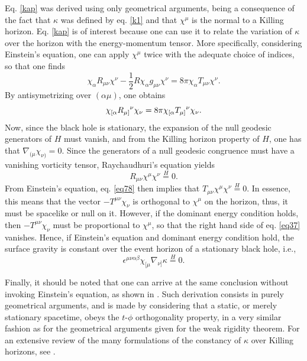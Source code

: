 \documentclass[
12pt,		%
openright,	%
twoside,  %
a4paper,			%
chapter=TITLE,		%
english,			%
french,				%
spanish,			%
brazil				%
]{USPSC-classe/USPSC}
\begin{document}
Eq. \ref{kap} was derived using only geometrical arguments, being a consequence of the fact that $\kappa$ was defined by eq. \ref{k1} and that $\chi^{\mu}$ is the normal to a Killing horizon. Eq. \ref{kap} is of interest because one can use it to relate the variation of $\kappa$ over the horizon with the energy-momentum tensor. More specifically, considering Einstein's equation, one can apply $\chi^{\mu}$ twice with the adequate choice of indices, so that one finds
\begin{equation}
    \chi_{\alpha}R_{\mu\nu}\chi^{\nu}-\frac{1}{2}R\chi_{\alpha}g_{\mu\nu}\chi^{\nu}=8\pi\chi_{\alpha}T_{\mu\nu}\chi^{\nu}.
\end{equation}
By antisymetrizing over $(\alpha\mu)$, one obtains
\begin{equation}\label{eq37}
\chi_{[\alpha}R_{\mu]}\mathstrut^{\nu}\chi_{\nu}=8\pi\chi_{[\alpha}T_{\mu]}\mathstrut^{\nu}\chi_{\nu}.
\end{equation}
Now, since the black hole is stationary, the expansion of the null geodesic generators of $H$ must vanish, and from the Killing horizon property of $H$, one has that $\nabla_{(\mu}\chi_{\nu)}=0$. Since the generators of a null geodesic congruence must have a vanishing vorticity tensor, Raychaudhuri's equation yields
\begin{equation}\label{eq78}
    R_{\mu\nu}\chi^{\mu}\chi^{\nu}\overset{H}{=}0.
\end{equation}
From Einstein's equation, eq. \ref{eq78} then implies that $T_{\mu\nu}\chi^{\mu}\chi^{\nu}\overset{H}{=}0$. In essence, this means that the vector $-T^{\mu\nu}\chi_{\nu}$ is orthogonal to $\chi^{\mu}$ on the horizon, thus, it must be spacelike or null on it. However, if the dominant energy condition holds, then $-T^{\mu\nu}\chi_{\nu}$ must be proportional to $\chi^{\mu}$, so that the right hand side of eq. \ref{eq37} vanishes. Hence, if Einstein's equation and dominant energy condition hold, the surface gravity is constant over the event horizon of a stationary black hole, i.e., 
\begin{equation}
\epsilon^{\mu\nu\alpha\beta}\chi_{[\mu}\nabla_{\nu]}\kappa\overset{H}{=}0.
\end{equation}

Finally, it should be noted that one can arrive at the same conclusion without invoking Einstein's equation, as shown in \cite{Rácz1996}. Such derivation consists in purely geometrical arguments, and is made by considering that a static, or merely stationary spacetime, obeys the $t$-$\phi$ orthogonality property, in a very similar fashion as for the geometrical arguments given for the weak rigidity theorem. For an extensive review of the many formulations of the constancy of $\kappa$ over Killing horizons, see \cite{Heusler1996}.
\end{document}
